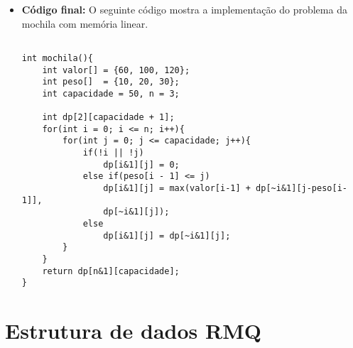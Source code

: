 \begin{itemize}
\item \textbf{Código final:} 
O seguinte código mostra a implementação do problema da mochila com memória linear.
\begin{lstlisting}[caption={Implementação Mochila},label={lst:lis}]

int mochila(){
	int valor[] = {60, 100, 120};
	int peso[]  = {10, 20, 30};
	int capacidade = 50, n = 3;

	int dp[2][capacidade + 1];
	for(int i = 0; i <= n; i++){
		for(int j = 0; j <= capacidade; j++){
			if(!i || !j)
				dp[i&1][j] = 0;
			else if(peso[i - 1] <= j)
				dp[i&1][j] = max(valor[i-1] + dp[~i&1][j-peso[i-1]],
				dp[~i&1][j]);
			else
				dp[i&1][j] = dp[~i&1][j];
		}
	}
	return dp[n&1][capacidade]; 
}
\end{lstlisting}
\end{itemize}








\section{Estrutura de dados RMQ}

